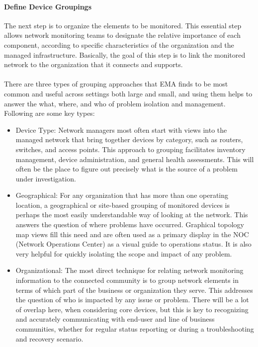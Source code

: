 \documentclass[8pt]{extarticle}
\begin{document}
\begin{multicols}{3}
\paragraph{Define Device Groupings}
The next step is to organize the elements to be monitored. This essential step allows network monitoring teams to 
designate the relative importance of each component, according to specific characteristics of the organization and
the managed infrastructure. Basically, the goal of this step is to link the monitored network to the
organization that it connects and supports. \\
\\
There are three types of grouping approaches that EMA finds to be most common and useful across
settings both large and small, and using them helps to answer the what, where, and who of problem
isolation and management. Following are some key types:
\begin{itemize}
    \item Device Type: Network managers most often start with views into the managed network that bring
    together devices by category, such as routers, switches, and access points. This approach to grouping
    facilitates inventory management, device administration, and general health assessments. This will
    often be the place to figure out precisely what is the source of a problem under investigation.
    \item Geographical: For any organization that has more than one operating location, a geographical or
    site-based grouping of monitored devices is perhaps the most easily understandable way of looking
    at the network. This answers the question of where problems have occurred. Graphical topology
    map views fill this need and are often used as a primary display in the NOC (Network Operations
    Center) as a visual guide to operations status. It is also very helpful for quickly isolating the scope
    and impact of any problem.
    \item Organizational: The most direct technique for relating network monitoring information to the
    connected community is to group network elements in terms of which part of the business or
    organization they serve. This addresses the question of who is impacted by any issue or problem.
    There will be a lot of overlap here, when considering core devices, but this is key to recognizing and
    accurately communicating with end-user and line of business communities, whether for regular
    status reporting or during a troubleshooting and recovery scenario.
\end{itemize}


\end{multicols}
\end{document}
